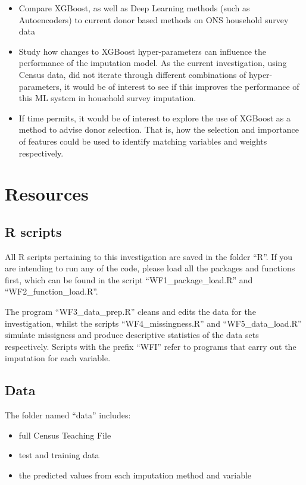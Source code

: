 \documentclass[]{book}
\providecommand{\tightlist}{%
  \setlength{\itemsep}{0pt}\setlength{\parskip}{0pt}}
\begin{document}
\begin{itemize}
\tightlist
\item
  Compare XGBoost, as well as Deep Learning methods (such as
  Autoencoders) to current donor based methods on ONS household survey
  data\\
\item
  Study how changes to XGBoost hyper-parameters can influence the
  performance of the imputation model. As the current investigation,
  using Census data, did not iterate through different combinations of
  hyper-parameters, it would be of interest to see if this improves the
  performance of this ML system in household survey imputation.\\
\item
  If time permits, it would be of interest to explore the use of XGBoost
  as a method to advise donor selection. That is, how the selection and
  importance of features could be used to identify matching variables
  and weights respectively.
\end{itemize}

\chapter{Resources}\label{resources}

\section{R scripts}\label{r-scripts}

All R scripts pertaining to this investigation are saved in the folder
``R''. If you are intending to run any of the code, please load all the
packages and functions first, which can be found in the script
``WF1\_package\_load.R'' and ``WF2\_function\_load.R''.

The program ``WF3\_data\_prep.R'' cleans and edits the data for the
investigation, whilst the scripts ``WF4\_missingness.R'' and
``WF5\_data\_load.R'' simulate missigness and produce descriptive
statistics of the data sets respectively. Scripts with the prefix
``WFI'' refer to programs that carry out the imputation for each
variable.

\section{Data}\label{data}

The folder named ``data'' includes:

\begin{itemize}
\tightlist
\item
  full Census Teaching File
\item
  test and training data
\item
  the predicted values from each imputation method and variable
\end{itemize}
\end{document}
